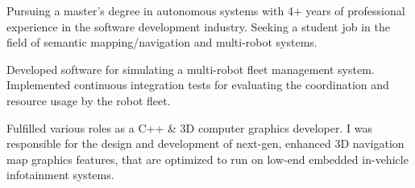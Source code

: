 \documentclass[10pt,a4paper,ragged2e]{altacv}
\begin{document}

\begin{fullwidth}
\makecvheader
\end{fullwidth}



Pursuing a master's degree in autonomous systems with 4+ years of professional experience in the  software development industry. Seeking a student job in the field of semantic mapping/navigation and multi-robot systems.


Developed software for simulating a multi-robot fleet management system. Implemented continuous integration tests for evaluating the coordination and resource usage by the robot fleet.

\divider

Fulfilled various roles as a C++ \& 3D computer graphics developer. I was responsible for the design and development of next-gen, enhanced 3D navigation map graphics features, that are optimized to run on low-end embedded in-vehicle infotainment systems.
\end{document}
